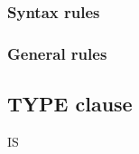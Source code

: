 \subsubsection{Syntax rules}

\subsubsection{General rules}

\subsection{TYPE clause}
\begin{syntax}
   IS
  \begin{1=}
    \begin{1=}
      \begin{1=}
          \\
      \end{1=} \\
      \begin{1=}
          \\
      \end{1=}
    \end{1=}
    \begin{1=}
      \identifier \\
    \end{1=}
    \begin{0-1}
       
    \end{0-1} \\

    \begin{1=}
       \\
    \end{1=} \\

    \begin{1=}
        \\
    \end{1=} \\

    \begin{1=}
        \\
    \end{1=} \\

    \begin{1=}
        \\
    \end{1=} \\

    \begin{1=}
        \\
    \end{1=}
  \end{1=}
\end{syntax}

